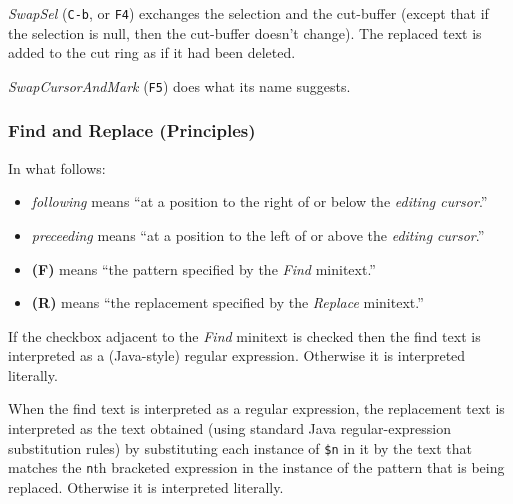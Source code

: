 \documentclass[
]{article}
\begin{document}
\emph{SwapSel} (\texttt{C-b}, or \texttt{F4}) exchanges the selection
and the cut-buffer (except that if the selection is null, then the
cut-buffer doesn't change). The replaced text is added to the cut ring
as if it had been deleted.

\emph{SwapCursorAndMark} (\texttt{F5}) does what its name suggests.

\hypertarget{find-and-replace-principles}{%
\subsubsection{Find and Replace
(Principles)}\label{find-and-replace-principles}}

In what follows:

\begin{itemize}
\item
  \emph{following} means ``at a position to the right of or below the
  \emph{editing cursor}.''
\item
  \emph{preceeding} means ``at a position to the left of or above the
  \emph{editing cursor}.''
\item
  \textbf{(F)} means ``the pattern specified by the \emph{Find}
  minitext.''
\item
  \textbf{(R)} means ``the replacement specified by the \emph{Replace}
  minitext.''
\end{itemize}

If the checkbox adjacent to the \emph{Find} minitext is checked then the
find text is interpreted as a (Java-style) regular expression. Otherwise
it is interpreted literally.

When the find text is interpreted as a regular expression, the
replacement text is interpreted as the text obtained (using standard
Java regular-expression substitution rules) by substituting each
instance of \texttt{\$n} in it by the text that matches the \texttt{n}th
bracketed expression in the instance of the pattern that is being
replaced. Otherwise it is interpreted literally.
\end{document}
